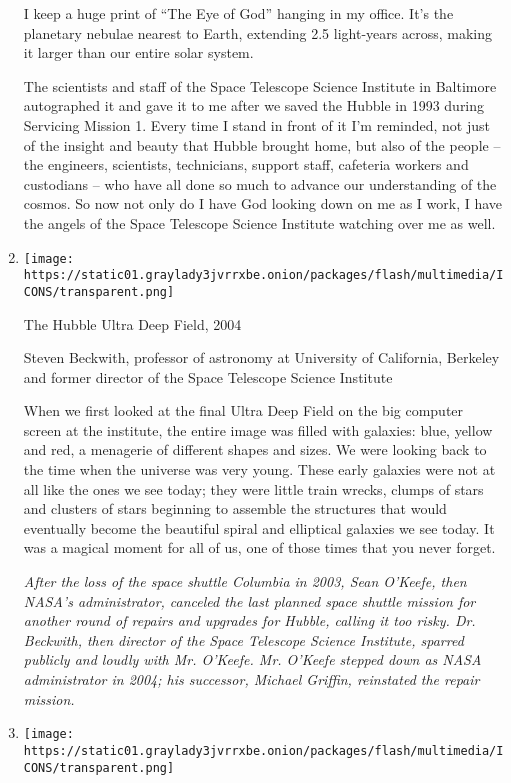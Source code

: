 \begin{enumerate}
  I keep a huge print of ``The Eye of God'' hanging in my office. It's
  the planetary nebulae nearest to Earth, extending 2.5 light-years
  across, making it larger than our entire solar system.

  The scientists and staff of the Space Telescope Science Institute in
  Baltimore autographed it and gave it to me after we saved the Hubble
  in 1993 during Servicing Mission 1. Every time I stand in front of it
  I'm reminded, not just of the insight and beauty that Hubble brought
  home, but also of the people -- the engineers, scientists,
  technicians, support staff, cafeteria workers and custodians -- who
  have all done so much to advance our understanding of the cosmos. So
  now not only do I have God looking down on me as I work, I have the
  angels of the Space Telescope Science Institute watching over me as
  well.
\item
  \texttt{[image: https://static01.graylady3jvrrxbe.onion/packages/flash/multimedia/ICONS/transparent.png]}

  The Hubble Ultra Deep Field, 2004

  Steven Beckwith, professor of astronomy at University of California,
  Berkeley and former director of the Space Telescope Science Institute

  When we first looked at the final Ultra Deep Field on the big computer
  screen at the institute, the entire image was filled with galaxies:
  blue, yellow and red, a menagerie of different shapes and sizes. We
  were looking back to the time when the universe was very young. These
  early galaxies were not at all like the ones we see today; they were
  little train wrecks, clumps of stars and clusters of stars beginning
  to assemble the structures that would eventually become the beautiful
  spiral and elliptical galaxies we see today. It was a magical moment
  for all of us, one of those times that you never forget.

  \emph{After the loss of the space shuttle Columbia in 2003, Sean
  O'Keefe, then NASA's administrator, canceled the last planned space
  shuttle mission for another round of repairs and upgrades for Hubble,
  calling it too risky. Dr. Beckwith, then director of the Space
  Telescope Science Institute, sparred publicly and loudly with Mr.
  O'Keefe. Mr. O'Keefe stepped down as NASA administrator in 2004; his
  successor, Michael Griffin, reinstated the repair mission.}
\item
  \texttt{[image: https://static01.graylady3jvrrxbe.onion/packages/flash/multimedia/ICONS/transparent.png]}


\end{enumerate}
